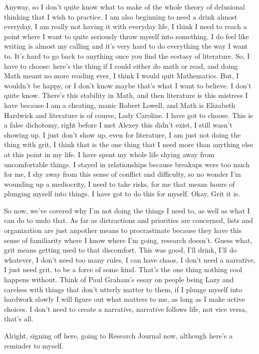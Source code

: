 Anyway, so I don't quite know what to make of the whole theory of delusional thinking that I wish to practice. I am also beginning to need a drink almost everyday, I am really not having it with everyday life, I think I need to reach a point where I want to quite seriously throw myself into something. I do feel like writing is almost my calling and it's very hard to do everything the way I want to. It's hard to go back to anything once you find the ecstasy of literature. So, I have to choose: here's the thing if I could either do math or read, and doing Math meant no more reading ever, I think I would quit Mathematics. But, I wouldn't be happy, or I don't know maybe that's what I want to believe. I don't quite know. There's this stability in Math, and then literature is this mistress I have because I am a cheating, manic Robert Lowell, and Math is Elizabeth Hardwick and literature is of course, Lady Caroline. I have got to choose. This is a false dichotomy, right before I met Alexey this didn't exist, I still wasn't showing up. I just don't show up, even for literature, I am just not doing the thing with grit, I think that is the one thing that I need more than anything else at this point in my life. I have spent my whole life shying away from uncomfortable things. I stayed in relationships because breakups were too much for me, I shy away from this sense of conflict and difficulty, so no wonder I'm wounding up a mediocrity, I need to take risks, for me that means hours of plunging myself into things. I have got to do this for myself. Okay, Grit it is.

So now, we've covered why I'm not doing the things I need to, as well as what I can do to undo that. As far as distractions and priorities are concerned, lists and organization are just anpother means to procrastinate because they have this sense of familiarity where I know where I'm going, research doesn't. Guess what, grit means getting used to that discomfort. This was good, I'll drink, I'll do whatever, I don't need too many rules, I can have chaos, I don't need a narrative, I just need grit, to be a force of some kind. That's the one thing nothing cool happens without. Think of Paul Graham's essay on people being Lazy and careless with things that don't utterly matter to them, if I plunge myself into hardwork slowly I will figure out what matters to me, as long as I make active choices. I don't need to create a narrative, narrative follows life, not vice versa, that's all.

Alright, signing off here, going to Research Journal now, although here's a reminder to myself.

